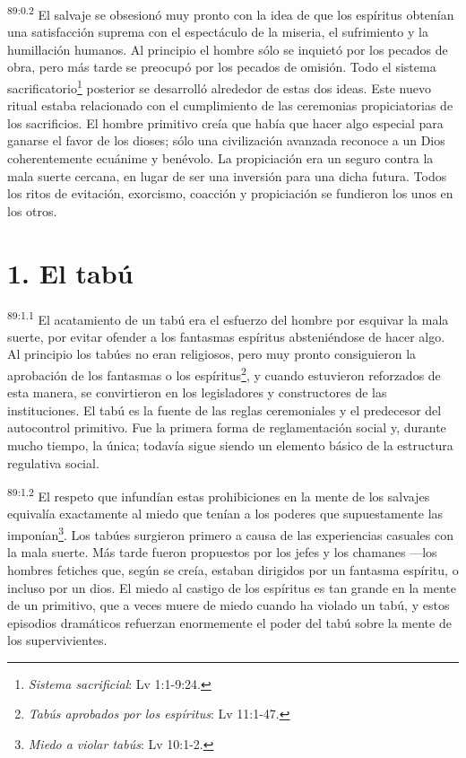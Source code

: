 \documentclass[twoside, 11pt]{book}
\begin{document}
\par
\textsuperscript{89:0.2} El salvaje se obsesionó muy pronto con la idea de que los espíritus obtenían una satisfacción suprema con el espectáculo de la miseria, el sufrimiento y la humillación humanos. Al principio el hombre sólo se inquietó por los pecados de obra, pero más tarde se preocupó por los pecados de omisión. Todo el sistema sacrificatorio\footnote{\textit{Sistema sacrificial}: Lv 1:1-9:24.} posterior se desarrolló alrededor de estas dos ideas. Este nuevo ritual estaba relacionado con el cumplimiento de las ceremonias propiciatorias de los sacrificios. El hombre primitivo creía que había que hacer algo especial para ganarse el favor de los dioses; sólo una civilización avanzada reconoce a un Dios coherentemente ecuánime y benévolo. La propiciación era un seguro contra la mala suerte cercana, en lugar de ser una inversión para una dicha futura. Todos los ritos de evitación, exorcismo, coacción y propiciación se fundieron los unos en los otros.

\section*{1. El tabú}
\par
\textsuperscript{89:1.1} El acatamiento de un tabú era el esfuerzo del hombre por esquivar la mala suerte, por evitar ofender a los fantasmas espíritus absteniéndose de hacer algo. Al principio los tabúes no eran religiosos, pero muy pronto consiguieron la aprobación de los fantasmas o los espíritus\footnote{\textit{Tabús aprobados por los espíritus}: Lv 11:1-47.}, y cuando estuvieron reforzados de esta manera, se convirtieron en los legisladores y constructores de las instituciones. El tabú es la fuente de las reglas ceremoniales y el predecesor del autocontrol primitivo. Fue la primera forma de reglamentación social y, durante mucho tiempo, la única; todavía sigue siendo un elemento básico de la estructura regulativa social.

\par
\textsuperscript{89:1.2} El respeto que infundían estas prohibiciones en la mente de los salvajes equivalía exactamente al miedo que tenían a los poderes que supuestamente las imponían\footnote{\textit{Miedo a violar tabús}: Lv 10:1-2.}. Los tabúes surgieron primero a causa de las experiencias casuales con la mala suerte. Más tarde fueron propuestos por los jefes y los chamanes ---los hombres fetiches que, según se creía, estaban dirigidos por un fantasma espíritu, o incluso por un dios. El miedo al castigo de los espíritus es tan grande en la mente de un primitivo, que a veces muere de miedo cuando ha violado un tabú, y estos episodios dramáticos refuerzan enormemente el poder del tabú sobre la mente de los supervivientes.
\end{document}
